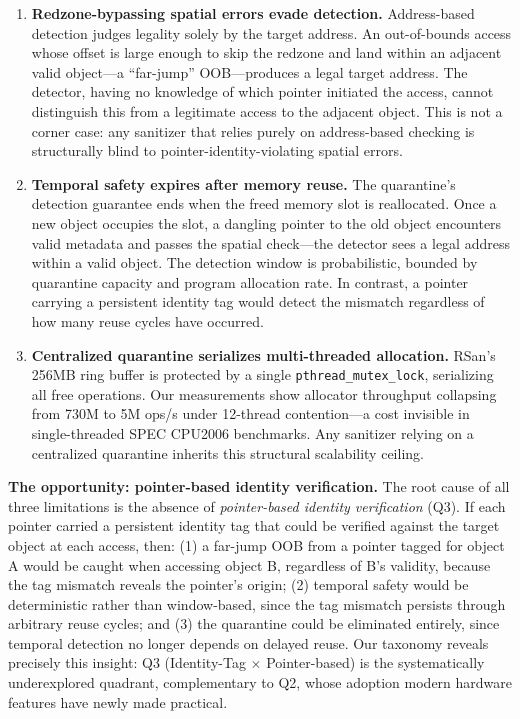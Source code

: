 \documentclass[cmc,article,submit,moreauthors,pdftex]{Definitions/tsp}
\begin{document}
\begin{enumerate}
\item \textbf{Redzone-bypassing spatial errors evade detection.} Address-based detection judges legality solely by the target address. An out-of-bounds access whose offset is large enough to skip the redzone and land within an adjacent valid object---a ``far-jump'' OOB---produces a legal target address. The detector, having no knowledge of which pointer initiated the access, cannot distinguish this from a legitimate access to the adjacent object. This is not a corner case: any sanitizer that relies purely on address-based checking is structurally blind to pointer-identity-violating spatial errors.

\item \textbf{Temporal safety expires after memory reuse.} The quarantine's detection guarantee ends when the freed memory slot is reallocated. Once a new object occupies the slot, a dangling pointer to the old object encounters valid metadata and passes the spatial check---the detector sees a legal address within a valid object. The detection window is probabilistic, bounded by quarantine capacity and program allocation rate. In contrast, a pointer carrying a persistent identity tag would detect the mismatch regardless of how many reuse cycles have occurred.

\item \textbf{Centralized quarantine serializes multi-threaded allocation.} RSan's 256MB ring buffer is protected by a single \texttt{pthread\_mutex\_lock}, serializing all free operations. Our measurements show allocator throughput collapsing from 730M to 5M ops/s under 12-thread contention---a cost invisible in single-threaded SPEC CPU2006 benchmarks. Any sanitizer relying on a centralized quarantine inherits this structural scalability ceiling.
\end{enumerate}

\textbf{The opportunity: pointer-based identity verification.}
The root cause of all three limitations is the absence of \emph{pointer-based identity verification} (Q3). If each pointer carried a persistent identity tag that could be verified against the target object at each access, then: (1) a far-jump OOB from a pointer tagged for object A would be caught when accessing object B, regardless of B's validity, because the tag mismatch reveals the pointer's origin; (2) temporal safety would be deterministic rather than window-based, since the tag mismatch persists through arbitrary reuse cycles; and (3) the quarantine could be eliminated entirely, since temporal detection no longer depends on delayed reuse. Our taxonomy reveals precisely this insight: Q3 (Identity-Tag $\times$ Pointer-based) is the systematically underexplored quadrant, complementary to Q2, whose adoption modern hardware features have newly made practical.
\end{document}
